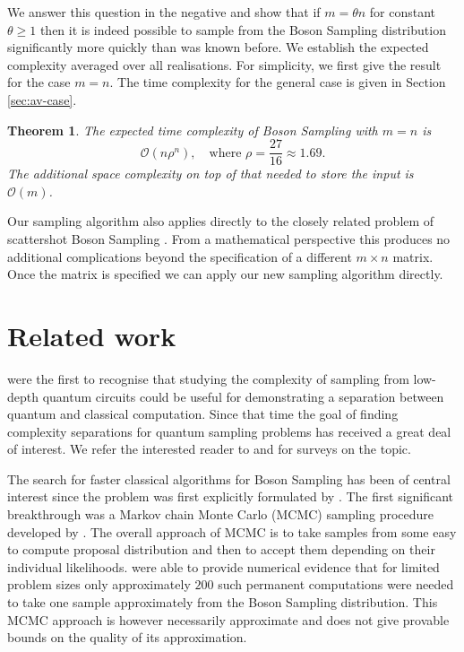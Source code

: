 \documentclass[a4paper,11pt]{article}
\newtheorem{thm}{Theorem}
\newcommand{\bigo}[1]{\mathcal{O}(#1)}
\def\BS/{Boson Sampling}
\begin{document}
  
We answer this question in the negative and show that if $m = \theta n$ for constant $\theta \geq 1$ then it is indeed possible to sample from the \BS/ distribution significantly more quickly than was known before.   We establish the expected complexity averaged over all realisations. For simplicity, we first give the result for the case $m = n$. The time complexity for the general case is given in Section \ref{sec:av-case}.
\vspace{0.5em}
\begin{thm}\label{thm1} The expected time complexity of \BS/ with $m = n$ is
$$\bigo{n \rho ^n},\quad \text{where $\rho = \textstyle{\frac{27}{16}} \approx 1.69$}.$$
The additional space complexity on top of that needed to store the input is $\bigo{m}$.
\end{thm}



Our sampling algorithm also applies directly to the closely related problem of scattershot \BS/ \citep[]{bentivegna2015experimental}. From a mathematical perspective this produces no additional complications beyond the specification of a different $m \times n$ matrix. Once the matrix is specified we can apply our new sampling algorithm directly. 

\section{Related work}
\citet{TD:2004} were the first to recognise that studying the complexity of sampling from low-depth quantum circuits could be useful for demonstrating a separation between quantum and classical computation. Since that time the goal of finding complexity separations for quantum sampling problems has received a great deal of interest. We refer the interested reader to \citet{LBR:2017} and \citet{HM:2017} for surveys on the topic.


The search for faster classical algorithms for \BS/ has been of central interest since the problem was first explicitly formulated  by \citeauthor{aaronson2011computational}.  The first significant breakthrough was a Markov chain Monte Carlo (MCMC) sampling procedure developed by \citet{neville2017classical}. The overall approach of MCMC is to take samples from some easy to compute proposal distribution and then to accept them depending on their individual likelihoods.  \citeauthor{neville2017classical} were able to provide numerical evidence that for limited problem sizes only approximately $200$ such permanent computations were needed to take one sample approximately from the \BS/ distribution. This MCMC approach is however necessarily approximate and does not give provable bounds on the quality of its approximation.
\end{document}
